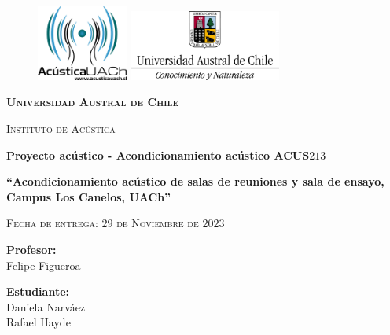 \thispagestyle{empty}
			\begin{figure}[ht]
		   \minipage{\textwidth}
				\includegraphics[width=3cm]{Imagenes/acustica-color.png}
				\label{escudoTecNM}
		   \endminipage
		   \minipage{\textwidth}
				\includegraphics[width=5cm]{Imagenes/UACh_Marcacolor.png}
				\label{EscudoITCJ}
			\endminipage
		\end{figure}
		
		\vspace{0.1cm}
		
		\begin{center}
		    {\scshape\LARGE \textbf{Universidad Austral de Chile} \par}
			{\scshape\Large Instituto de Acústica \par}
            \vspace{0.3cm}
             {\Large \textbf{Proyecto acústico - Acondicionamiento acústico ACUS$213$}}

			\begin{center}
				
			{\LARGE\bfseries ``Acondicionamiento acústico de salas de reuniones y sala de ensayo, Campus Los Canelos, UACh'' \par}
            \vspace{0.75cm}
            
		{\scshape\Large Fecha de entrega: $29$ de Noviembre de $2023$\par}	
        \vspace{0.75cm}
	    \LARGE	{ \textbf{Profesor:}}\\
        \large		{Felipe Figueroa}\\
        
		\vspace{0.5cm}	
		
		\LARGE	{ \textbf{Estudiante:}}\\
        \large	 {Daniela Narváez}\\
        \large   {Rafael Hayde}
    
        
        
        \normalsize	 {}

				\vspace{1.25cm}
				\vspace{0.9cm}
				
			\end{center}
	
		\end{center}